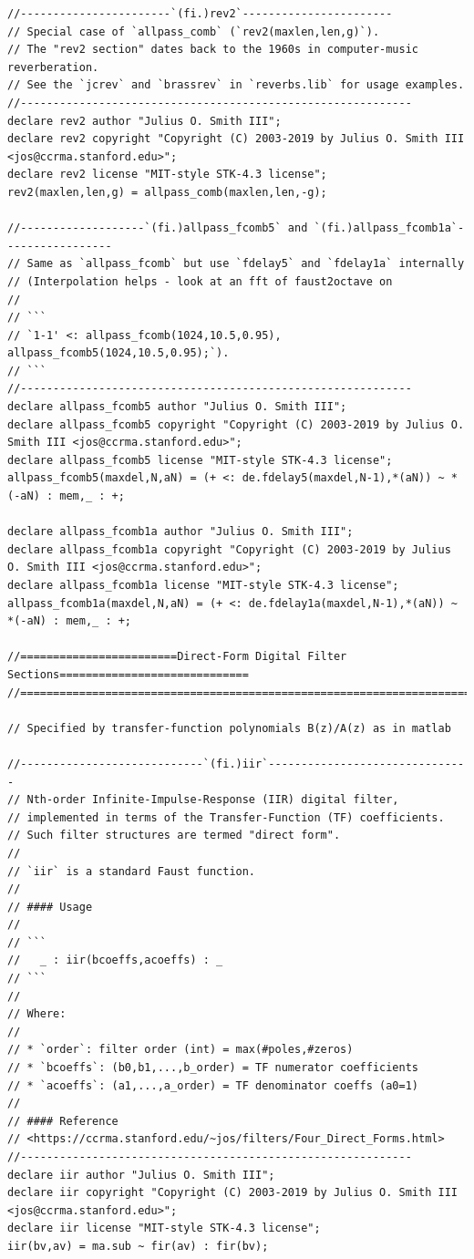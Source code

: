 \documentclass{article}
\begin{document}
\begin{lstlisting}[caption=\texttt{filters.lib}]
//-----------------------`(fi.)rev2`-----------------------
// Special case of `allpass_comb` (`rev2(maxlen,len,g)`).
// The "rev2 section" dates back to the 1960s in computer-music reverberation.
// See the `jcrev` and `brassrev` in `reverbs.lib` for usage examples.
//------------------------------------------------------------
declare rev2 author "Julius O. Smith III";
declare rev2 copyright "Copyright (C) 2003-2019 by Julius O. Smith III <jos@ccrma.stanford.edu>";
declare rev2 license "MIT-style STK-4.3 license";
rev2(maxlen,len,g) = allpass_comb(maxlen,len,-g);

//-------------------`(fi.)allpass_fcomb5` and `(fi.)allpass_fcomb1a`-----------------
// Same as `allpass_fcomb` but use `fdelay5` and `fdelay1a` internally
// (Interpolation helps - look at an fft of faust2octave on
//
// ```
// `1-1' <: allpass_fcomb(1024,10.5,0.95), allpass_fcomb5(1024,10.5,0.95);`).
// ```
//------------------------------------------------------------
declare allpass_fcomb5 author "Julius O. Smith III";
declare allpass_fcomb5 copyright "Copyright (C) 2003-2019 by Julius O. Smith III <jos@ccrma.stanford.edu>";
declare allpass_fcomb5 license "MIT-style STK-4.3 license";
allpass_fcomb5(maxdel,N,aN) = (+ <: de.fdelay5(maxdel,N-1),*(aN)) ~ *(-aN) : mem,_ : +;

declare allpass_fcomb1a author "Julius O. Smith III";
declare allpass_fcomb1a copyright "Copyright (C) 2003-2019 by Julius O. Smith III <jos@ccrma.stanford.edu>";
declare allpass_fcomb1a license "MIT-style STK-4.3 license";
allpass_fcomb1a(maxdel,N,aN) = (+ <: de.fdelay1a(maxdel,N-1),*(aN)) ~ *(-aN) : mem,_ : +;

//========================Direct-Form Digital Filter Sections=============================
//========================================================================================

// Specified by transfer-function polynomials B(z)/A(z) as in matlab

//----------------------------`(fi.)iir`-------------------------------
// Nth-order Infinite-Impulse-Response (IIR) digital filter,
// implemented in terms of the Transfer-Function (TF) coefficients.
// Such filter structures are termed "direct form".
//
// `iir` is a standard Faust function.
//
// #### Usage
//
// ```
//   _ : iir(bcoeffs,acoeffs) : _
// ```
//
// Where:
//
// * `order`: filter order (int) = max(#poles,#zeros)
// * `bcoeffs`: (b0,b1,...,b_order) = TF numerator coefficients
// * `acoeffs`: (a1,...,a_order) = TF denominator coeffs (a0=1)
//
// #### Reference
// <https://ccrma.stanford.edu/~jos/filters/Four_Direct_Forms.html>
//------------------------------------------------------------
declare iir author "Julius O. Smith III";
declare iir copyright "Copyright (C) 2003-2019 by Julius O. Smith III <jos@ccrma.stanford.edu>";
declare iir license "MIT-style STK-4.3 license";
iir(bv,av) = ma.sub ~ fir(av) : fir(bv);


\end{lstlisting}
\end{document}
